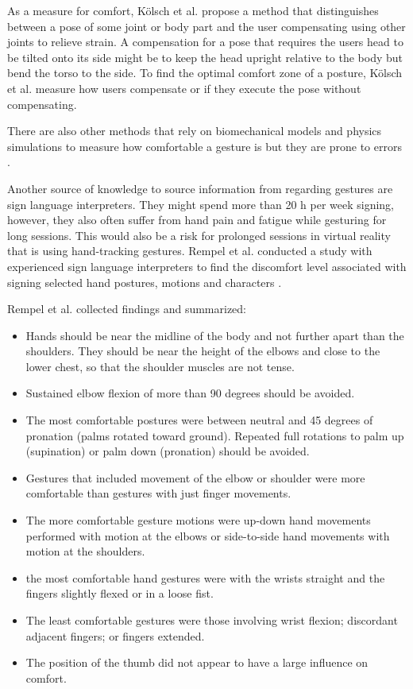 As a measure for comfort, Kölsch et al. propose a method that distinguishes between a pose of some joint or body part and the user compensating using other joints to relieve strain. A compensation for a pose that requires the users head to be tilted onto its side might be to keep the head upright relative to the body but bend the torso to the side. To find the optimal comfort zone of a posture, Kölsch et al. \cite{Koelsch} measure how users compensate or if they execute the pose without compensating. 

There are also other methods that rely on biomechanical models and physics simulations to measure how comfortable a gesture is but they are prone to errors \cite{Stern2006}.

Another source of knowledge to source information from regarding gestures are sign language interpreters. They might spend more than 20 h per week signing, however, they also often suffer from hand pain and fatigue while gesturing for long sessions. This would also be a risk for prolonged sessions in virtual reality that is using hand-tracking gestures. Rempel et al. conducted a study with experienced sign language interpreters to find the discomfort level associated with signing selected hand postures, motions and characters \cite{Rempel2014}. 

Rempel et al. \cite{Rempel2014} collected findings and summarized:
\begin{itemize}
  \item Hands should be near the midline of the body and not further apart than the shoulders. They should be near the height of the elbows and close to the lower chest, so that the shoulder muscles are not tense. 
  \item Sustained elbow flexion of more than 90 degrees should be avoided.
  \item The most comfortable postures were between neutral and 45 degrees of pronation (palms rotated toward ground). Repeated full rotations to palm up (supination) or palm down (pronation) should be avoided.
  \item Gestures that included movement of the elbow or shoulder were more comfortable than gestures with just finger movements.
  \item The more comfortable gesture motions were up-down hand movements performed with motion at the elbows or side-to-side hand movements with motion at the shoulders. 
  \item the most comfortable hand gestures were with the wrists straight and the fingers slightly flexed or in a loose fist.
  \item The least comfortable gestures were those involving wrist flexion; discordant adjacent fingers; or fingers extended.
  \item The position of the thumb did not appear to have a large influence on comfort.
\end{itemize}



